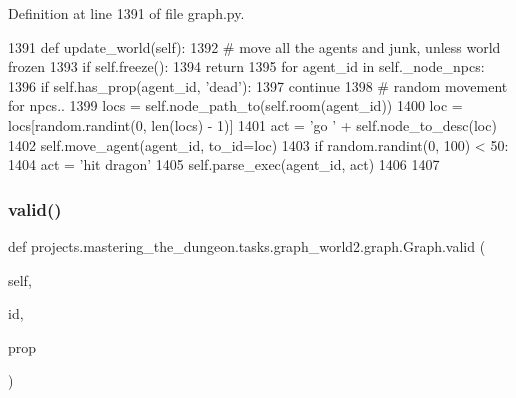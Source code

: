 Definition at line 1391 of file graph.\+py.


\begin{DoxyCode}
1391     \textcolor{keyword}{def }update\_world(self):
1392         \textcolor{comment}{# move all the agents and junk, unless world frozen}
1393         \textcolor{keywordflow}{if} self.freeze():
1394             \textcolor{keywordflow}{return}
1395         \textcolor{keywordflow}{for} agent\_id \textcolor{keywordflow}{in} self.\_node\_npcs:
1396             \textcolor{keywordflow}{if} self.has\_prop(agent\_id, \textcolor{stringliteral}{'dead'}):
1397                 \textcolor{keywordflow}{continue}
1398             \textcolor{comment}{# random movement for npcs..}
1399             locs = self.node\_path\_to(self.room(agent\_id))
1400             loc = locs[random.randint(0, len(locs) - 1)]
1401             act = \textcolor{stringliteral}{'go '} + self.node\_to\_desc(loc)
1402             self.move\_agent(agent\_id, to\_id=loc)
1403             \textcolor{keywordflow}{if} random.randint(0, 100) < 50:
1404                 act = \textcolor{stringliteral}{'hit dragon'}
1405             self.parse\_exec(agent\_id, act)
1406 
1407 
\end{DoxyCode}
\mbox{\label{classprojects_1_1mastering__the__dungeon_1_1tasks_1_1graph__world2_1_1graph_1_1Graph_a741f4883acfc4a2ed2ff4a0252147dd3}} 
\subsubsection{\texorpdfstring{valid()}{valid()}}
{\footnotesize\ttfamily def projects.\+mastering\+\_\+the\+\_\+dungeon.\+tasks.\+graph\+\_\+world2.\+graph.\+Graph.\+valid (\begin{DoxyParamCaption}\item[{}]{self,  }\item[{}]{id,  }\item[{}]{prop }\end{DoxyParamCaption})}



